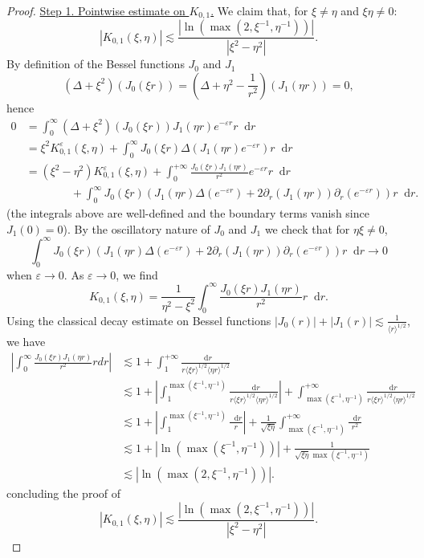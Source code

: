 \documentclass[11 pt]{amsart}
\newcommand{\tmem}{\underline}
\theoremstyle{definition}
\theoremstyle{remark}
\numberwithin{equation}{section}
\newcommand{\dd}{\mathop{}\!\mathrm{d}}
\begin{document}
\begin{proof}  {\tmem{Step 1. Pointwise estimate on $K_{0,1}$.}} We claim that, for $\xi \neq \eta$ and $\xi \eta \neq 0$:
  \[ | K_{0, 1} (\xi, \eta)  | \lesssim \frac{ | \ln (\max (2, \xi^{- 1}, \eta^{- 1})) |}{| \xi^2 - \eta^2 | }. \]
By definition of the Bessel functions $J_0$ and $J_1$
  \[ (\Delta + \xi^2) (J_0 (\xi r)) = \left( \Delta + \eta^2 - \frac{1}{r^2}
     \right) (J_1 (\eta r)) = 0, \]
hence
  \begin{align*}
    0 & = \int_0^\infty (\Delta + \xi^2) (J_0 (\xi r)) J_1 (\eta r) e^{-\varepsilon r} r \dd r \\
    & =  \xi^2 K_{0, 1}^{\varepsilon} (\xi, \eta) + \int_0^\infty J_0
    (\xi r) \Delta (J_1 (\eta r) e^{- \varepsilon r}) r \dd r\\
    & = (\xi^2 - \eta^2) K_{0, 1}^{\varepsilon} (\xi, \eta) + \int_0^{+\infty} \frac{J_0 (\xi r) J_1 (\eta r)}{r^2} e^{- \varepsilon r} r \dd r\\
& \qquad \qquad + \int_0^\infty J_0 (\xi r) (J_1 (\eta r) \Delta (e^{-
    \varepsilon r}) + 2 \partial_r (J_1 (\eta r)) \partial_r (e^{- \varepsilon
    r})) r \dd r.
  \end{align*}
(the integrals above are well-defined and the boundary terms vanish since $J_1(0)=0$).  By the oscillatory nature of $J_0$ and $J_1$ we check that for $\eta \xi
  \neq 0$,
  \[ \int_0^\infty J_0 (\xi r) (J_1 (\eta r) \Delta (e^{- \varepsilon r})
     + 2 \partial_r (J_1 (\eta r)) \partial_r (e^{- \varepsilon r})) r \dd r
     \rightarrow 0 \]
  when $\varepsilon \rightarrow 0$. As $\varepsilon \to 0$, we find
  \[ K_{0, 1} (\xi, \eta) = \frac{1}{\eta^2 - \xi^2} \int_0^\infty
     \frac{J_0 (\xi r) J_1 (\eta r)}{r^2} r \dd r. \]
Using the classical decay estimate on Bessel
functions $| J_0 (r) | + | J_1 (r) | \lesssim \frac{1}{\langle r \rangle^{1 /
2}}$, we have
\begin{align*}
\left| \int_0^\infty \frac{J_0 (\xi r) J_1 (\eta r)}{r^2} r d r
  \right| & \lesssim  1 + \int_1^{+ \infty} \frac{\dd r}{r \langle \xi r \rangle^{1 /
  2} \langle \eta r \rangle^{1 / 2}}\\
  & \lesssim 1 + \left| \int_1^{\max (\xi^{- 1}, \eta^{- 1})} \frac{\dd r}{r
  \langle \xi r \rangle^{1 / 2} \langle \eta r \rangle^{1 / 2}} \right| + \int_{\max (\xi^{- 1}, \eta^{- 1})}^{+ \infty} \frac{\dd r}{r \langle \xi r
  \rangle^{1 / 2} \langle \eta r \rangle^{1 / 2}}\\
  & \lesssim 1 + \left| \int_1^{\max (\xi^{- 1}, \eta^{- 1})} \frac{\dd r}{r}
  \right| + \frac{1}{\sqrt{\xi \eta}} \int_{\max (\xi^{- 1}, \eta^{- 1})}^{+
  \infty} \frac{\dd r}{r^2}\\
  & \lesssim  1 + | \ln (\max (\xi^{- 1}, \eta^{- 1})) | +
  \frac{1}{\sqrt{\xi \eta} \max (\xi^{- 1}, \eta^{- 1})}\\
  & \lesssim  | \ln (\max (2, \xi^{- 1}, \eta^{- 1})) | .
\end {align*}
concluding the proof of
  \[ | K_{0, 1} (\xi, \eta) | \lesssim \frac{ | \ln (\max (2, \xi^{- 1}, \eta^{- 1})) |}{| \xi^2 - \eta^2 | }. \]


\end{proof}
\end{document}

